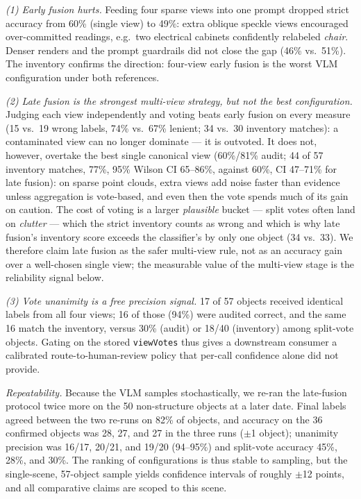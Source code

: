 \documentclass[conference]{IEEEtran}
\begin{document}
\emph{(1) Early fusion hurts.} Feeding four sparse views into one prompt
dropped strict accuracy from 60\% (single view) to 49\%: extra oblique
speckle views encouraged over-committed readings, e.g.\ two electrical
cabinets confidently relabeled \emph{chair}. Denser renders and the prompt
guardrails did not close the gap (46\% vs.\ 51\%). The inventory confirms
the direction: four-view early fusion is the worst VLM configuration under
both references.

\emph{(2) Late fusion is the strongest multi-view strategy, but not the
best configuration.} Judging each view independently and voting beats
early fusion on every measure (15 vs.\ 19 wrong labels, 74\% vs.\ 67\%
lenient; 34 vs.\ 30 inventory matches): a contaminated view can no longer
dominate --- it is outvoted. It does not, however, overtake the best
single canonical view (60\%/81\% audit; 44 of 57 inventory matches, 77\%,
95\% Wilson CI 65--86\%, against 60\%, CI 47--71\% for late fusion): on
sparse point clouds, extra views add noise faster than evidence unless
aggregation is vote-based, and even then the vote spends much of its gain
on caution. The cost of voting is a larger \emph{plausible} bucket ---
split votes often land on \emph{clutter} --- which the strict inventory
counts as wrong and which is why late fusion's inventory score exceeds the
classifier's by only one object (34 vs.\ 33). We therefore claim
late fusion as the safer multi-view rule, not as an accuracy gain over a
well-chosen single view; the measurable value of the multi-view stage is
the reliability signal below.

\emph{(3) Vote unanimity is a free precision signal.} 17 of 57 objects
received identical labels from all four views; 16 of those (94\%) were
audited correct, and the same 16 match the inventory, versus 30\% (audit)
or 18/40 (inventory) among split-vote objects. Gating on the stored
\texttt{viewVotes} thus gives a downstream consumer a calibrated
route-to-human-review policy that per-call confidence alone did not
provide.

\emph{Repeatability.} Because the VLM samples stochastically, we re-ran
the late-fusion protocol twice more on the 50 non-structure objects at a
later date. Final labels agreed between the two re-runs on 82\% of
objects, and accuracy on the 36 confirmed objects was 28, 27, and 27 in
the three runs ($\pm$1 object); unanimity precision was 16/17, 20/21, and
19/20 (94--95\%) and split-vote accuracy 45\%, 28\%, and 30\%. The
ranking of configurations is thus stable to sampling, but the
single-scene, 57-object sample yields confidence intervals of roughly
$\pm$12 points, and all comparative claims are scoped to this scene.
\end{document}
